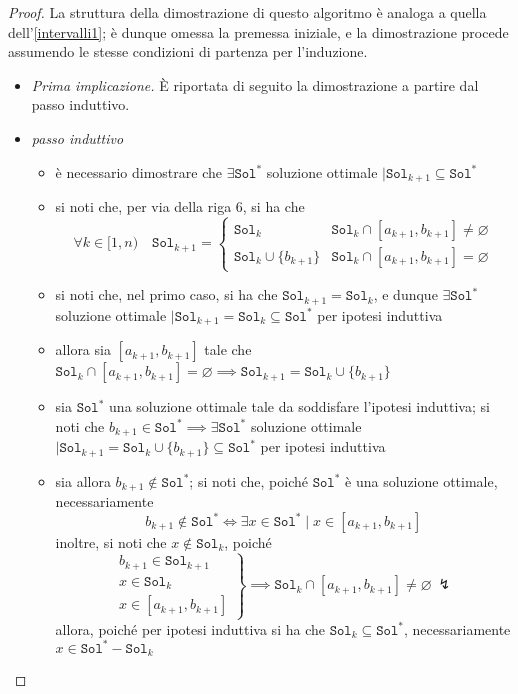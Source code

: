\documentclass[a4paper, 12pt]{report}
\begin{document}
    \begin{proof}
        La struttura della dimostrazione di questo algoritmo è analoga a quella dell'\cref{intervalli1}; è dunque omessa la premessa iniziale, e la dimostrazione procede assumendo le stesse condizioni di partenza per l'induzione.

        \begin{itemize}
            \item[] \textit{Prima implicazione.} È riportata di seguito la dimostrazione a partire dal passo induttivo. 
            \item \textit{passo induttivo}
                \begin{itemize}
                    \item è necessario dimostrare che $\exists \texttt{Sol}^*$ soluzione ottimale $\mid \texttt{Sol}_{k + 1} \subseteq \texttt{Sol}^*$
                    \item si noti che, per via della riga 6, si ha che $$\forall k \in [1, n) \quad \texttt{Sol}_{k +1} = \left \{ \begin{array}{ll} \texttt{Sol}_k & \texttt{Sol}_k \cap [a_{k +1}, b_{k+1}] \neq \varnothing \\ \texttt{Sol}_k \cup \{b_{k +1}\} & \texttt{Sol}_k \cap [a_{k +1}, b_{k +1}] = \varnothing \end{array} \right.$$
                    \item si noti che, nel primo caso, si ha che $\texttt{Sol}_{k +1} = \texttt{Sol}_k$, e dunque $\exists \texttt{Sol}^*$ soluzione ottimale $\mid \texttt{Sol}_{k +1} = \texttt{Sol}_k \subseteq \texttt{Sol}^*$ per ipotesi induttiva
                    \item allora sia $[a_{k+1}, b_{k+1}]$ tale che $\texttt{Sol}_k \cap [a_{k+1}, b_{k +1}] = \varnothing \implies \texttt{Sol}_{k +1} = \texttt{Sol}_k \cup \{b_{k +1}\}$
                    \item sia $\texttt{Sol}^*$ una soluzione ottimale tale da soddisfare l'ipotesi induttiva; si noti che $b_{k +1} \in \texttt{Sol}^* \implies \exists \texttt{Sol}^*$ soluzione ottimale $\mid \texttt{Sol}_{k +1} = \texttt{Sol}_k \cup \{ b_{k +1}\} \subseteq \texttt{Sol}^*$ per ipotesi induttiva
                    \item sia allora $b_{k +1} \notin \texttt{Sol}^*$; si noti che, poiché $\texttt{Sol}^*$ è una soluzione ottimale, necessariamente $$b_{k +1} \notin \texttt{Sol}^* \iff \exists x \in \texttt{Sol}^*  \mid x \in [a_{k + 1}, b_{k +1}]$$ inoltre, si noti che $x \notin \texttt{Sol}_k$, poiché $$\left . \begin{array}{r} b_{k +1} \in \texttt{Sol}_{k +1} \\ x \in \texttt{Sol}_k \\ x \in [a_{k +1}, b_{ k+1}] \end{array} \right \} \implies \texttt{Sol}_k \cap [a_{k +1}, b_{k +1}] \neq \varnothing \ \lightning$$ allora, poiché per ipotesi induttiva si ha che $\texttt{Sol}_k \subseteq \texttt{Sol}^*$, necessariamente $x \in \texttt{Sol}^* - \texttt{Sol}_k$

\end{itemize}
\end{itemize}
\end{proof}
\end{document}
